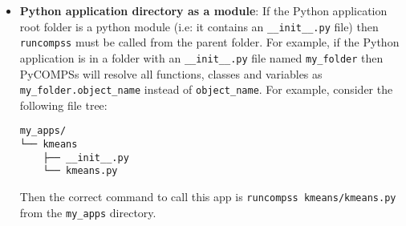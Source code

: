 \begin{itemize}
\item \textbf{Python application directory as a module}:\newline
If the Python application root folder is a python module (i.e: it contains an \verb|__init__.py| file) then \verb|runcompss| must be called from
the parent folder. For example, if the Python application is in a folder with an \verb|__init__.py| file named \verb|my_folder| then PyCOMPSs will
resolve all functions, classes and variables as \verb|my_folder.object_name| instead of \verb|object_name|. For example, consider the following file
tree:
\begin{lstlisting}[]
my_apps/
└── kmeans
    ├── __init__.py
    └── kmeans.py
\end{lstlisting}
Then the correct command to call this app is \verb|runcompss kmeans/kmeans.py| from the \verb|my_apps| directory.


\end{itemize}

